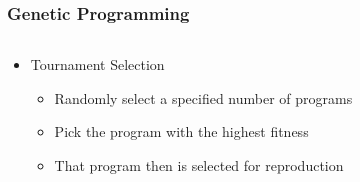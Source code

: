 \documentclass{beamer}
\begin{document}
\begin{frame}
	\frametitle{Genetic Programming}

\begin{columns}[T]

\begin{column}{0.5\textwidth}

\begin{itemize}
	\item Tournament Selection
	\\
	\begin{itemize}
	\item Randomly select a specified number of programs
	\item Pick the program with the highest fitness
	\item That program then is selected for reproduction
	
	\end{itemize}
	

\end{itemize}
\end{column}
\end{columns}
\end{frame}
\end{document}
